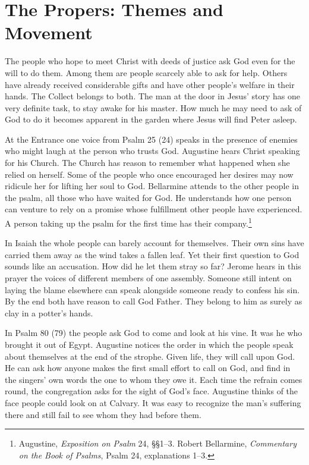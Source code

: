 \section{The Propers: Themes and Movement}

The people who hope to meet Christ with deeds of justice ask God even for the will to do them. Among them are people scarcely able to ask for help. Others have already received considerable gifts and have other people's welfare in their hands. The Collect belongs to both. The man at the door in Jesus' story has one very definite task, to stay awake for his master. How much he may need to ask of God to do it becomes apparent in the garden where Jesus will find Peter asleep.

At the Entrance one voice from Psalm 25 (24) speaks in the presence of enemies who might laugh at the person who trusts God. Augustine hears Christ speaking for his Church. The Church has reason to remember what happened when she relied on herself. Some of the people who once encouraged her desires may now ridicule her for lifting her soul to God. Bellarmine attends to the other people in the psalm, all those who have waited for God. He understands how one person can venture to rely on a promise whose fulfillment other people have experienced. A person taking up the psalm for the first time has their company.\footnote{Augustine, \textit{Exposition on Psalm} 24, §§1--3. Robert Bellarmine, \textit{Commentary on the Book of Psalms}, Psalm 24, explanations 1--3.}

In Isaiah the whole people can barely account for themselves. Their own sins have carried them away as the wind takes a fallen leaf. Yet their first question to God sounds like an accusation. How did he let them stray so far? Jerome hears in this prayer the voices of different members of one assembly. Someone still intent on laying the blame elsewhere can speak alongside someone ready to confess his sin. By the end both have reason to call God Father. They belong to him as surely as clay in a potter's hands.

In Psalm 80 (79) the people ask God to come and look at his vine. It was he who brought it out of Egypt. Augustine notices the order in which the people speak about themselves at the end of the strophe. Given life, they will call upon God. He can ask how anyone makes the first small effort to call on God, and find in the singers' own words the one to whom they owe it. Each time the refrain comes round, the congregation asks for the sight of God's face. Augustine thinks of the face people could look on at Calvary. It was easy to recognize the man's suffering there and still fail to see whom they had before them.

